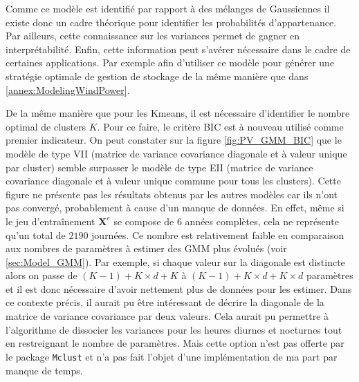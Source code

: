 \documentclass[12pt, french]{report}
\begin{document}
Comme ce modèle est identifié par rapport à des mélanges de Gaussiennes il existe donc un cadre théorique pour identifier les probabilités d'appartenance. Par ailleurs, cette connaissance sur les variances permet de gagner en interprétabilité. Enfin, cette information peut s'avérer nécessaire dans le cadre de certaines applications. Par exemple afin d'utiliser ce modèle pour générer une stratégie optimale de gestion de stockage de la même manière que dans \ref{annex:ModelingWindPower}.

De la même manière que pour les Kmeans, il est nécessaire d'identifier le nombre optimal de clusters $K$. Pour ce faire, le critère BIC est à nouveau utilisé comme premier indicateur. On peut constater sur la figure \ref{fig:PV_GMM_BIC} que le modèle de type VII (matrice de variance covariance diagonale et à valeur unique par cluster) semble surpasser le modèle de type EII (matrice de variance covariance diagonale et à valeur unique commune pour tous les clusters). Cette figure ne présente pas les résultats obtenus par les autres modèles car ils n'ont pas convergé, probablement à cause d'un manque de données. En effet, même si le jeu d'entraînement $\bm{X}^e$ se compose de 6 années complètes, cela ne représente qu'un total de $2190$ journées. Ce nombre est relativement faible en comparaison aux nombres de paramètres à estimer des GMM plus évolués (voir \ref{sec:Model_GMM}). Par exemple, si chaque valeur sur la diagonale est distincte alors on passe de $(K-1) + K\times d + K$ à $(K-1) + K\times d + K \times d$ paramètres et il est donc nécessaire d'avoir nettement plus de données pour les estimer. Dans ce contexte précis, il aurait pu être intéressant de décrire la diagonale de la matrice de variance covariance par deux valeurs. Cela aurait pu permettre à l'algorithme de dissocier les variances pour les heures diurnes et nocturnes tout en restreignant le nombre de paramètres. Mais cette option n'est pas offerte par le package \texttt{Mclust} et n'a pas fait l'objet d'une implémentation de ma part par manque de temps.
\end{document}
